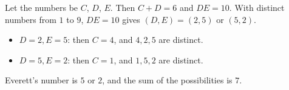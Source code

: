 Let the numbers be $C$, $D$, $E$. Then $C+D=6$ and $DE=10$. With distinct numbers from $1$ to $9$, $DE=10$ gives $(D,E)=(2,5)$ or $(5,2)$.
\begin{itemize}
\item $D=2,E=5$: then $C=4$, and $4,2,5$ are distinct.
\item $D=5,E=2$: then $C=1$, and $1,5,2$ are distinct.
\end{itemize}
Everett's number is $5$ or $2$, and the sum of the possibilities is $\boxed{7}$.
